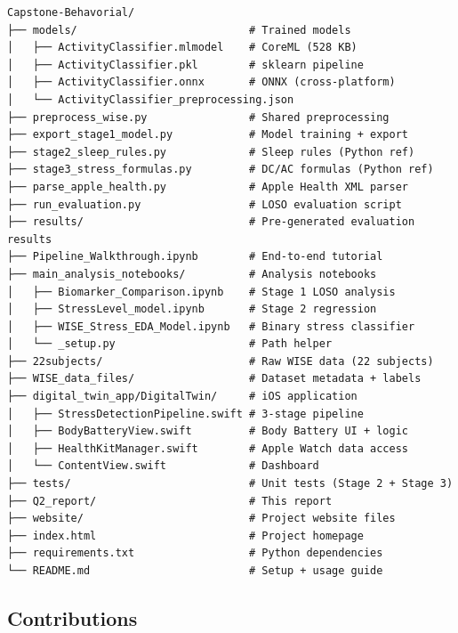 \documentclass[12pt,letterpaper]{article}
\begin{document}
{\footnotesize
\begin{verbatim}
Capstone-Behavorial/
├── models/                           # Trained models
│   ├── ActivityClassifier.mlmodel    # CoreML (528 KB)
│   ├── ActivityClassifier.pkl        # sklearn pipeline
│   ├── ActivityClassifier.onnx       # ONNX (cross-platform)
│   └── ActivityClassifier_preprocessing.json
├── preprocess_wise.py                # Shared preprocessing
├── export_stage1_model.py            # Model training + export
├── stage2_sleep_rules.py             # Sleep rules (Python ref)
├── stage3_stress_formulas.py         # DC/AC formulas (Python ref)
├── parse_apple_health.py             # Apple Health XML parser
├── run_evaluation.py                 # LOSO evaluation script
├── results/                          # Pre-generated evaluation results
├── Pipeline_Walkthrough.ipynb        # End-to-end tutorial
├── main_analysis_notebooks/          # Analysis notebooks
│   ├── Biomarker_Comparison.ipynb    # Stage 1 LOSO analysis
│   ├── StressLevel_model.ipynb       # Stage 2 regression
│   ├── WISE_Stress_EDA_Model.ipynb   # Binary stress classifier
│   └── _setup.py                     # Path helper
├── 22subjects/                       # Raw WISE data (22 subjects)
├── WISE_data_files/                  # Dataset metadata + labels
├── digital_twin_app/DigitalTwin/     # iOS application
│   ├── StressDetectionPipeline.swift # 3-stage pipeline
│   ├── BodyBatteryView.swift         # Body Battery UI + logic
│   ├── HealthKitManager.swift        # Apple Watch data access
│   └── ContentView.swift             # Dashboard
├── tests/                            # Unit tests (Stage 2 + Stage 3)
├── Q2_report/                        # This report
├── website/                          # Project website files
├── index.html                        # Project homepage
├── requirements.txt                  # Python dependencies
└── README.md                         # Setup + usage guide
\end{verbatim}
}


\subsection{Contributions}
\end{document}
